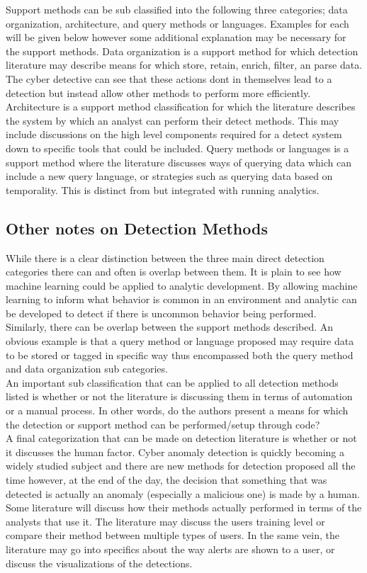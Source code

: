 \documentclass[10pt]{IEEEtran}
\begin{document}
Support methods can be sub classified into the following three categories; data organization, architecture, and query methods or languages. Examples for each will be given below however some additional explanation may be necessary for the support methods. Data organization is a support method for which detection literature may describe means for which store, retain, enrich, filter, an parse data. The cyber detective can see that these actions dont in themselves lead to a detection but instead allow other methods to perform more efficiently. Architecture is a support method classification for which the literature describes the system by which an analyst can perform their detect methods. This may include discussions on the high level components required for a detect system down to specific tools that could be included. Query methods or languages is a support method where the literature discusses ways of querying data which can include a new query language, or strategies such as querying data based on temporality. This is distinct from but integrated with running analytics.

\subsection{Other notes on Detection Methods}
While there is a clear distinction between the three main direct detection categories there can and often is overlap between them. It is plain to see how machine learning could be applied to analytic development. By allowing machine learning to inform what behavior is common in an environment and analytic can be developed to detect if there is uncommon behavior being performed.\\
Similarly, there can be overlap between the support methods described. An obvious example is that a query method or language proposed may require data to be stored or tagged in specific way thus encompassed both the query method and data organization sub categories.\\
An important sub classification that can be applied to all detection methods listed is whether or not the literature is discussing them in terms of automation or a manual process. In other words, do the authors present a means for which the detection or support method can be performed/setup through code?\\
A final categorization that can be made on detection literature is whether or not it discusses the human factor. Cyber anomaly detection is quickly becoming a widely studied subject and there are new methods for detection proposed all the time however, at the end of the day, the decision that something that was detected is actually an anomaly (especially a malicious one) is made by a human. Some literature will discuss how their methods actually performed in terms of the analysts that use it. The literature may discuss the users training level or compare their method between multiple types of users. In the same vein, the literature may go into specifics about the way alerts are shown to a user, or discuss the visualizations of the detections.
\end{document}
